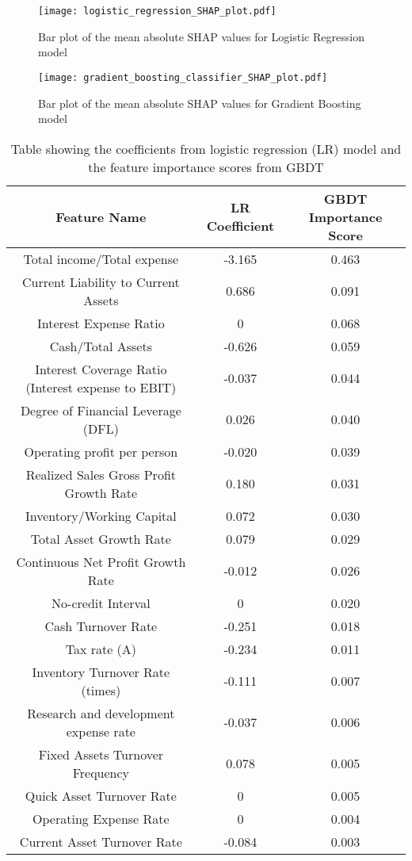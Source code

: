 \documentclass[11pt]{article}
\begin{document}
\begin{figure}
    \centering
    \texttt{[image: logistic\_regression\_SHAP\_plot.pdf]}
    \caption{Bar plot of the mean absolute SHAP values for Logistic Regression model}
    \label{fig:LogRegSHAP}
\end{figure}

\begin{figure}
    \centering
    \texttt{[image: gradient\_boosting\_classifier\_SHAP\_plot.pdf]}
    \caption{Bar plot of the mean absolute SHAP values for Gradient Boosting model}
    \label{fig:gbcSHAP}
\end{figure}


\begin{table}[]
    \centering
    \begin{tabular}{|c|c|c|}
    \hline
    Feature Name & LR Coefficient & GBDT Importance Score \\ \hline
       Total income/Total expense & -3.165 & 0.463 \\ \hline
Current Liability to Current Assets & 0.686 & 0.091 \\ \hline
Interest Expense Ratio & 0 & 0.068 \\ \hline
Cash/Total Assets & -0.626 & 0.059 \\ \hline
Interest Coverage Ratio (Interest expense to EBIT) & -0.037 & 0.044 \\ \hline
Degree of Financial Leverage (DFL) & 0.026 & 0.040 \\ \hline
Operating profit per person & -0.020 & 0.039 \\ \hline
Realized Sales Gross Profit Growth Rate & 0.180 & 0.031 \\ \hline
Inventory/Working Capital & 0.072 & 0.030 \\ \hline
Total Asset Growth Rate & 0.079 & 0.029 \\ \hline
Continuous Net Profit Growth Rate & -0.012 & 0.026 \\ \hline
No-credit Interval & 0 & 0.020 \\ \hline
Cash Turnover Rate & -0.251 & 0.018 \\ \hline
Tax rate (A) & -0.234 & 0.011 \\ \hline
Inventory Turnover Rate (times) & -0.111 & 0.007 \\ \hline
Research and development expense rate & -0.037 & 0.006 \\ \hline
Fixed Assets Turnover Frequency & 0.078 & 0.005 \\ \hline
Quick Asset Turnover Rate & 0 & 0.005 \\ \hline
Operating Expense Rate & 0 & 0.004 \\ \hline
Current Asset Turnover Rate & -0.084 & 0.003 \\ \hline
    \end{tabular}
    \caption{Table showing the coefficients from logistic regression (LR) model and the feature importance scores from GBDT}
    \label{tab:modelFeatureImportances}
\end{table}
\end{document}
